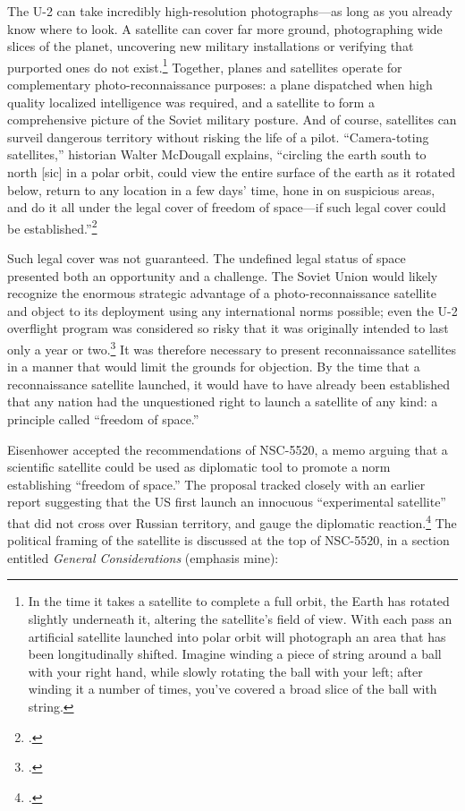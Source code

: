 \documentclass[12pt]{extarticle}
\begin{document}
The U-2 can take incredibly high-resolution photographs---as long as you already know where to look. A satellite can cover far more ground, photographing wide slices of the planet, uncovering new military installations or verifying that purported ones do not exist.\footnote{In the time it takes a satellite to complete a full orbit, the Earth has rotated slightly underneath it, altering the satellite's field of view. With each pass an artificial satellite launched into polar orbit will photograph an area that has been longitudinally shifted. Imagine winding a piece of string around a ball with your right hand, while slowly rotating the ball with your left; after winding it a number of times, you've covered a broad slice of the ball with string.} Together, planes and satellites operate for complementary photo-reconnaissance purposes: a plane dispatched when high quality localized intelligence was required, and a satellite to form a comprehensive picture of the Soviet military posture. And of course, satellites can surveil dangerous territory without risking the life of a pilot. \enquote{Camera-toting satellites,} historian Walter McDougall explains, \enquote{circling the earth south to north [sic] in a polar orbit, could view the entire surface of the earth as it rotated below, return to any location in a few days' time, hone in on suspicious areas, and do it all under the legal cover of freedom of space---if such legal cover could be established.}\footcite[117]{mcdougall_heavens_1985}

Such legal cover was not guaranteed. The undefined legal status of space presented both an opportunity and a challenge. The Soviet Union would likely recognize the enormous strategic advantage of a photo-reconnaissance satellite and object to its deployment using any international norms possible; even the U-2 overflight program was considered so risky that it was originally intended to last only a year or two.\footcite[33]{lindgren_trust_2000} It was therefore necessary to present reconnaissance satellites in a manner that would limit the grounds for objection. By the time that a reconnaissance satellite launched, it would have to have already been established that any nation had the unquestioned right to launch a satellite of any kind: a principle called \enquote{freedom of space.}

Eisenhower accepted the recommendations of NSC-5520, a memo arguing that a scientific satellite could be used as diplomatic tool to promote a norm establishing ``freedom of space.'' The proposal tracked closely with an earlier report suggesting that the US first launch an innocuous ``experimental satellite'' that did not cross over Russian territory, and gauge the diplomatic reaction.\footcite[21]{kecskemetic_satellite_1950} The political framing of the satellite is discussed at the top of NSC-5520, in a section entitled \emph{General Considerations} (emphasis mine):
\newline
\end{document}
